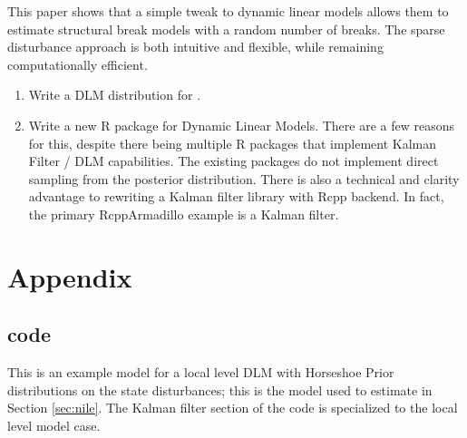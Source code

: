 \documentclass{article}
\begin{document}
This paper shows that a simple tweak to dynamic linear models allows them to estimate structural break models with a random number of breaks.
The sparse disturbance approach is both intuitive and flexible, while remaining computationally efficient.

\begin{enumerate}
\item Write a DLM distribution for \Stan{}.
\item Write a new R package for Dynamic Linear Models. There are a few reasons for this, despite there being multiple R packages that implement Kalman Filter / DLM capabilities. 
The existing packages do not implement direct sampling from the posterior distribution. 
There is also a technical and clarity advantage to rewriting a Kalman filter library with Rcpp backend. In fact, the primary RcppArmadillo example is 
a Kalman filter.
\end{enumerate}

\clearpage{}

\printbibliography{}

\section{Appendix}
\label{sec:appendix
}
\subsection{code}
\label{sec:code}

This is an example \Stan{} model for a local level DLM with Horseshoe Prior distributions on the state disturbances; this is the \Stan{} model used to estimate  in Section \ref{sec:nile}. 
The Kalman filter section of the \Stan{} code is specialized to the local level model case.

\begin{singlespace}
    
\end{singlespace}
\end{document}
